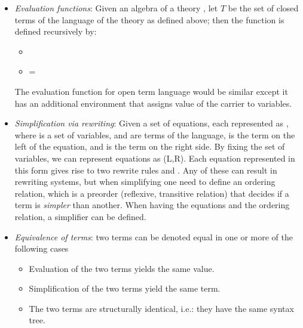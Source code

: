 \begin{itemize}
\begin{itemize}
    \end{itemize}     
    \item \emph{Evaluation functions}: Given an algebra  of a theory \lstmath{$\Gamma = (\sort,\fsyms,\equations$)}, let $T$ be the set of closed terms of the language of the theory as defined above; then the function  is defined recursively by:  
    \begin{itemize}
        \item {}
        \item {} =  
    \end{itemize}      
    The evaluation function for open term language would be similar except it has an additional environment that assigns value of the carrier to variables. 
    \item \emph{Simplification via rewriting}: Given a set of equations, each represented as , where  is a set of variables,  and  are terms of the language,  is the term on the left of the equation, and  is the term on the right side. By fixing the set of variables, we can represent equations as  (L,R). Each equation represented in this form gives rise to two rewrite rules  and . Any of these can result in rewriting systems, but when simplifying one need to define an ordering relation, which is a preorder (reflexive, transitive relation) that decides if a term is \emph{simpler} than another. When having the equations and the ordering relation, a simplifier can be defined. 
    \item \emph{Equivalence of terms}: two terms can be denoted equal in one or more of the following cases 
    \begin{itemize}
        \item Evaluation of the two terms yields the same value. 
        \item Simplification of the two terms yield the same term. 
        \item The two terms are structurally identical, i.e.: they have the same syntax tree. 
    \end{itemize}
\end{itemize}


